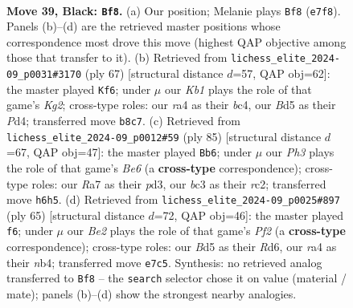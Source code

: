 \documentclass[11pt]{article}
\begin{document}
\clearpage

\begin{figure}[p]\centering
\begin{subfigure}{0.46\textwidth}\centering
\resizebox{\linewidth}{!}{%
\newchessgame
\chessboard[
  setfen={1k5r/rp2b1p1/p1p4p/P2b1p2/R1p4P/2B1P1P1/1P3P1N/2K1R3 b - - 1 39},
  showmover=false,
  pgfstyle=straightmove, color=movearrow, markmove={e7-f8}
]}
\caption{}
\end{subfigure}\hfill
\begin{subfigure}{0.46\textwidth}\centering
\resizebox{\linewidth}{!}{%
\newchessgame
\chessboard[
  setfen={3r4/1b2r1k1/p5p1/P3pp1p/2Bp3P/3P1P2/1PPR2P1/4R1K1 b - - 0 34},
  showmover=false,
  pgfstyle=straightmove, color=movearrow, markmove={g7-f6}
]}
\caption{}
\end{subfigure}
\\[4pt]
\begin{subfigure}{0.46\textwidth}\centering
\resizebox{\linewidth}{!}{%
\newchessgame
\chessboard[
  setfen={8/2r3pk/2p1Bp2/p3pPpb/1r2P3/1P1Pb2P/R1R1N1PK/8 b - - 3 43},
  showmover=false,
  pgfstyle=straightmove, color=movearrow, markmove={e3-b6}
]}
\caption{}
\end{subfigure}\hfill
\begin{subfigure}{0.46\textwidth}\centering
\resizebox{\linewidth}{!}{%
\newchessgame
\chessboard[
  setfen={3r2k1/5pp1/p2r3p/P2pp3/1Np3P1/1bP1PP1P/1P1R1K2/R7 b - - 0 33},
  showmover=false,
  pgfstyle=straightmove, color=movearrow, markmove={f7-f6}
]}
\caption{}
\end{subfigure}
\caption{\textbf{Move 39, Black: \texttt{Bf8}.} (a) Our position; Melanie plays \texttt{Bf8} (\texttt{e7f8}). Panels (b)--(d) are the retrieved master positions whose correspondence most drove this move (highest QAP objective among those that transfer to it). (b) Retrieved from \texttt{lichess\_elite\_2024-09\_p0031\#3170} (ply 67) [structural distance $d$=57, QAP obj=62]: the master played \texttt{Kf6}; under $\mu$ our \emph{Kb1} plays the role of that game's \emph{Kg2}; cross-type roles: our \emph{r}a4 as their \emph{b}c4, our \emph{B}d5 as their \emph{P}d4; transferred move \texttt{b8c7}. (c) Retrieved from \texttt{lichess\_elite\_2024-09\_p0012\#59} (ply 85) [structural distance $d$=67, QAP obj=47]: the master played \texttt{Bb6}; under $\mu$ our \emph{Ph3} plays the role of that game's \emph{Be6} (a \textbf{cross-type} correspondence); cross-type roles: our \emph{R}a7 as their \emph{p}d3, our \emph{b}c3 as their \emph{r}c2; transferred move \texttt{h6h5}. (d) Retrieved from \texttt{lichess\_elite\_2024-09\_p0025\#897} (ply 65) [structural distance $d$=72, QAP obj=46]: the master played \texttt{f6}; under $\mu$ our \emph{Be2} plays the role of that game's \emph{Pf2} (a \textbf{cross-type} correspondence); cross-type roles: our \emph{B}d5 as their \emph{R}d6, our \emph{r}a4 as their \emph{n}b4; transferred move \texttt{e7c5}. Synthesis: no retrieved analog transferred to \texttt{Bf8} -- the \texttt{search} selector chose it on value (material / mate); panels (b)--(d) show the strongest nearby analogies.}
\label{fig:thought-m77}
\end{figure}
\end{document}
